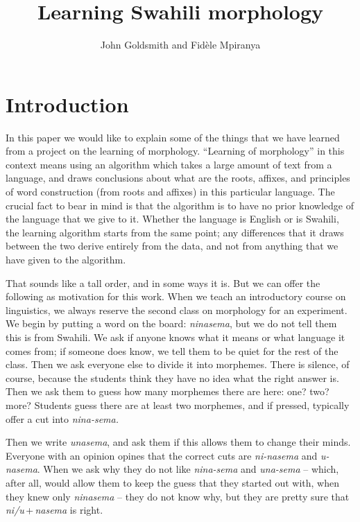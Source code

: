 \documentclass[output=paper,colorlinks,citecolor=brown]{langscibook}
\title{Learning Swahili morphology}
\author{John Goldsmith\affiliation{University of Chicago} and Fidèle Mpiranya\affiliation{University of Chicago}}
\begin{document}
\maketitle 

\section{Introduction}\label{sec:goldsmith:1}

In this paper we would like to explain some of the things that we have learned from a project on the learning of morphology. ``Learning of morphology'' in this context means using an algorithm which takes a large amount of text from a language, and draws conclusions about what are the roots, affixes, and principles of word construction (from roots and affixes) in this particular language. The crucial fact to bear in mind is that the algorithm is to have no prior knowledge of the language that we give to it. Whether the language is English or is Swahili, the learning algorithm starts from the same point; any differences that it draws between the two derive entirely from the data, and not from anything that we have given to the algorithm. 

That sounds like a tall order, and in some ways it is. But we can offer the following as motivation for this work. When we teach an introductory course on linguistics, we always reserve the second class on morphology for an experiment. We begin by putting a word on the board: \textit{ninasema}, but we do not tell them this is from Swahili. We ask if anyone knows what it means or what language it comes from; if someone does know, we tell them to be quiet for the rest of the class. Then we ask everyone else to divide it into morphemes. There is silence, of course, because the students think they have no idea what the right answer is. Then we ask them to guess how many morphemes there are here: one? two? more? Students guess there are at least two morphemes, and if pressed, typically offer a cut into \textit{nina-sema.}

Then we write \textit{unasema}, and ask them if this allows them to change their minds. Everyone with an opinion opines that the correct cuts are \textit{ni-nasema} and \textit{u-nasema}. When we ask why they do not like \textit{nina-sema} and \textit{una-sema} -- which, after all, would allow them to keep the guess that they started out with, when they knew only \textit{ninasema} -- they do not know why, but they are pretty sure that \textit{ni/u}\,+\,\textit{nasema} is right.
\end{document}

